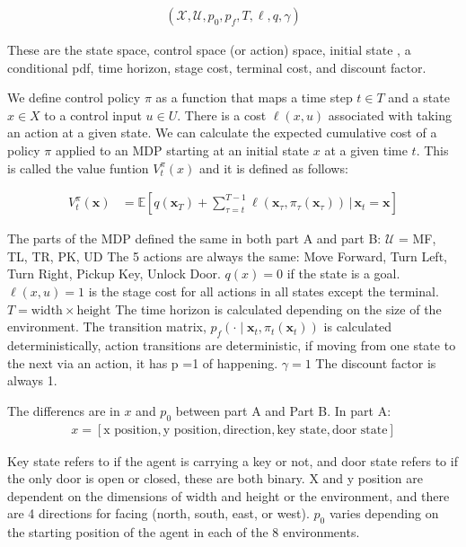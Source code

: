 \documentclass[conference]{IEEEtran}
\begin{document}
\begin{align}
(\mathcal{X}, \mathcal{U}, p_0,p_f, T, \ell, q, \gamma)
\end{align}
 
These are the state space, control space (or action) space, initial state , a conditional pdf, time horizon, stage cost, terminal cost, and discount factor.

We define control policy $\pi$ as a function that maps a time step $t \in T$ and a state $x \in X$ to a control input $u \in U$. There is a cost $\ell(x, u)$ associated with taking an action at a 
given state. We can calculate the expected cumulative cost of a policy $\pi$ applied to an MDP starting at an initial state $x$ at a given time $t$. This is called the value funtion $V_t^\pi(x)$
and it is defined as follows:

\begin{align}
V^\pi_t(\mathbf{x}) &= \mathbb{E}\left[q(\mathbf{x}_T) + \sum_{\tau=t}^{T-1} \ell(\mathbf{x}_\tau, \pi_\tau(\mathbf{x}_\tau)) \,\Big|\, \mathbf{x}_t = \mathbf{x}\right]
\end{align}

The parts of the MDP defined the same in both part A and part B:
$\mathcal{U}$ = {MF, TL, TR, PK, UD} The 5 actions are always the same: Move Forward, Turn Left, Turn Right, Pickup Key, Unlock Door.
$q(x) = 0$ if the state is a goal.
$\ell(x,u) = 1$ is the stage cost for all actions in all states except the terminal.
$T = \text{width} \times \text{height}$ The time horizon is calculated depending on the size of the environment. The transition matrix,
$p_f(\cdot \mid \mathbf{x}_t, \pi_t(\mathbf{x}_t))$ is calculated deterministically, action transitions are deterministic, if moving from one state to the next via an 
action, it has p =1 of happening.
$\gamma = 1$ The discount factor is always 1.

The differencs are in $x$ and $p_0$ between part A and Part B. In part A:
\begin{align}
x = [\text{x position}, \text{y position}, \text{direction}, \text{key state}, \text{door state}]
\end{align}

Key state refers to if the agent is carrying a key or not, and door state
refers to if the only door is open or closed, these are both binary. X and y position are dependent on the dimensions of width and height or the environment, and there are 4 directions for facing (north,
south, east, or west).
$p_0$ varies depending on the starting position of the agent in each of the 8 environments.
\end{document}

